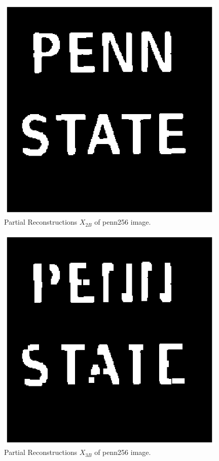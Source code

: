 \documentclass[paper=a4, fontsize=11pt]{scrartcl}
\begin{document}
\begin{figure}
	\centering
	\includegraphics[width=11cm]{X2Bpenn.eps}
	\caption{Partial Reconstructions $X_{2B}$ of penn256 image.}
	\label{fig:12}
\end{figure}

\begin{figure}
	\centering
	\includegraphics[width=11cm]{X3Bpenn.eps}
	\caption{Partial Reconstructions $X_{3B}$ of penn256 image.}
	\label{fig:13}
\end{figure}
\end{document}
